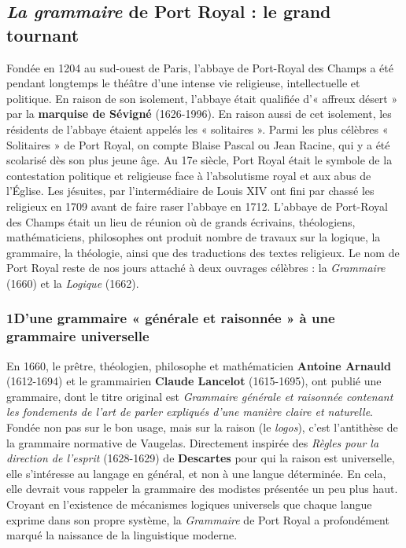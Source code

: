 \subsection{\textit{La grammaire} de Port Royal : le grand tournant}
Fondée en 1204 au sud-ouest de Paris, l’abbaye de Port-Royal des Champs a été pendant longtemps le théâtre d’une intense vie religieuse, intellectuelle et politique. En raison de son isolement, l’abbaye était qualifiée d’« affreux désert » par la \textbf{marquise de Sévigné} (1626-1996).
En raison aussi de cet isolement, les résidents de l’abbaye étaient appelés les « solitaires ». Parmi les plus célèbres « Solitaires » de Port Royal, on compte Blaise Pascal ou Jean Racine, qui y a été scolarisé dès son plus jeune âge.
Au 17e siècle, Port Royal était le symbole de la contestation politique et religieuse face à l’absolutisme royal et aux abus de l’Église. Les jésuites, par l’intermédiaire de Louis XIV ont fini par chassé les religieux en 1709 avant de faire raser l’abbaye en 1712. L’abbaye de Port-Royal des Champs était un lieu de réunion où de grands écrivains, théologiens, mathématiciens, philosophes ont produit nombre de travaux sur la logique, la grammaire, la théologie, ainsi que des traductions des textes religieux. Le nom de Port Royal reste de nos jours attaché à deux ouvrages célèbres : la \textit{Grammaire} (1660) et la \textit{Logique} (1662).
\subsubsection*{1\quad D’une grammaire « générale et raisonnée » à une grammaire universelle}
En 1660, le prêtre, théologien, philosophe et mathématicien \textbf{Antoine Arnauld} (1612-1694) et le grammairien \textbf{Claude Lancelot} (1615-1695), ont publié une grammaire, dont le titre original est \textit{Grammaire générale et raisonnée contenant les fondements de l’art de parler expliqués d’une manière claire et naturelle}. Fondée non pas sur le bon usage, mais sur la raison (le \textit{logos}), c’est l’antithèse de la grammaire normative de Vaugelas. Directement inspirée des \textit{Règles pour la direction de l’esprit} (1628-1629) de \textbf{Descartes} pour qui la raison est universelle, elle s’intéresse au langage en général, et non à une langue déterminée. En cela, elle devrait vous rappeler la grammaire des modistes présentée un peu plus haut. Croyant en l’existence de mécanismes logiques universels que chaque langue exprime dans son propre système, la \textit{Grammaire} de Port Royal a profondément marqué la naissance de la linguistique moderne.

